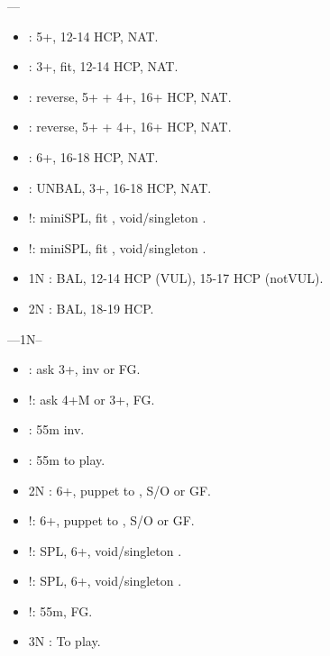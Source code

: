 \documentclass[12pt,twoside,a5paper]{report}%
\begin{document}
	----
	\begin{itemize}
	\renewcommand{\labelitemi}{}
	\item {} : 5+\cl{}, 12-14 HCP, NAT.
	\item {} : 3+\di{}, fit, 12-14 HCP, NAT.
	\item {} : reverse, 5+\cl{} + 4+\he{}, 16+ HCP, NAT.
	\item {} : reverse, 5+\cl{} + 4+\sp{}, 16+ HCP, NAT.
	\item {} : 6+\cl{}, 16-18 HCP, NAT.
	\item {} : UNBAL, 3+\di{}, 16-18 HCP, NAT.
	\item {}!: miniSPL, fit \di{}, void/singleton \he{}.
	\item {}!: miniSPL, fit \di{}, void/singleton \sp{}.
	\item 1N : BAL, 12-14 HCP (VUL), 15-17 HCP (notVUL).
	\item 2N : BAL, 18-19 HCP.
	\end{itemize}

	----1N--%
	\begin{itemize}
	\renewcommand{\labelitemi}{}
	\item {} : ask 3+\di{}, inv or FG.
	\item {}!: ask 4+M or 3+\di{}, FG.
	\item {} : 55m inv.
	\item {} : 55m to play.
	\item 2N : 6+\cl{}, puppet to , S/O or GF.
	\item {}!: 6+\di{}, puppet to , S/O or GF.
	\item {}!: SPL, 6+\di{}, void/singleton \he{}.
	\item {}!: SPL, 6+\di{}, void/singleton \sp{}.
	\item {}!: 55m, FG.
	\item 3N : To play.
	\end{itemize}

\end{document}

